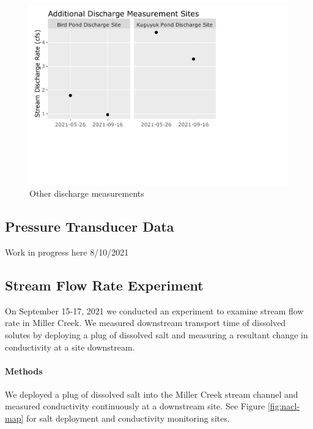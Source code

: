 \documentclass[
]{book}
\begin{document}
\begin{figure}
\centering
\includegraphics{Miller_Creek_Vogel_Lake_Water_Quality_files/figure-latex/other-discharge-1.pdf}
\caption{\label{fig:other-discharge}Other discharge measurements}
\end{figure}

\hypertarget{pressure-transducer-data}{%
\subsection{Pressure Transducer Data}\label{pressure-transducer-data}}

Work in progress here 8/10/2021

\hypertarget{stream-flow-rate-experiment}{%
\subsection{Stream Flow Rate Experiment}\label{stream-flow-rate-experiment}}

On September 15-17, 2021 we conducted an experiment to examine stream flow rate in Miller Creek. We measured downstream transport time of dissolved solutes by deploying a plug of dissolved salt and measuring a resultant change in conductivity at a site downstream.

\hypertarget{methods}{%
\paragraph{Methods}\label{methods}}

We deployed a plug of dissolved salt into the Miller Creek stream channel and measured conductivity continuously at a downstream site. See Figure \ref{fig:nacl-map} for salt deployment and conductivity monitoring sites.
\end{document}
